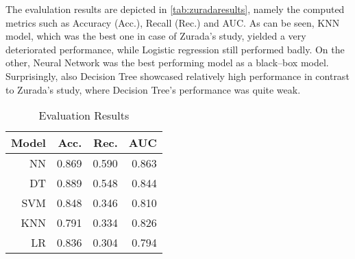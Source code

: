 The evalulation results are depicted in \autoref{tab:zuradaresults}, namely the computed metrics such as Accuracy (Acc.), Recall (Rec.) and AUC.
As can be seen, KNN model, which was the best one in case of Zurada's study, yielded a very deteriorated performance, while Logistic regression still performed badly.
On the other, Neural Network was the best performing model as a black--box model. Surprisingly, also Decision Tree showcased relatively high performance in contrast to Zurada's study, where Decision Tree's performance was quite weak.
\begin{table}[H]
    \small
    \setlength{\tabcolsep}{8pt}
    \renewcommand{\arraystretch}{1.3}
    \centering
    \caption[Evaluation Results \citep{zurada2014classification}]{Evaluation Results \citep{zurada2014classification}}\label{tab:zuradaresults}
    \begin{tabular}{r r r r}
    \toprule
    \textbf{Model} & \textbf{Acc.} & \textbf{Rec.} & \textbf{AUC}\\
    \midrule
    \hline
    NN & 0.869 & 0.590 & 0.863 \\
    DT & 0.889 & 0.548 & 0.844 \\
    SVM & 0.848 & 0.346 & 0.810 \\
    KNN & 0.791 & 0.334 & 0.826 \\
    LR & 0.836 & 0.304 & 0.794 \\
    \hline
    \bottomrule
    \end{tabular}
    \vspace{0.35em}
    
    \vspace{-1em}
\end{table}

